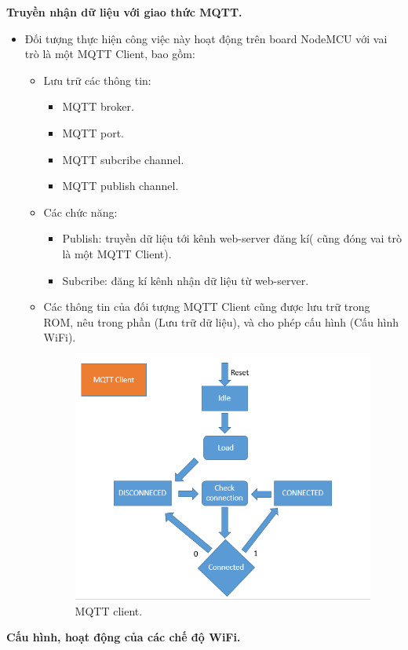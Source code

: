 \documentclass[a4paper,12pt,oneside]{article}
\begin{document}
\noindent \textbf{Truyền nhận dữ liệu với giao thức MQTT.}
	\begin{itemize}
	\item Đối tượng thực hiện công việc này hoạt động trên board NodeMCU với vai trò là một MQTT Client, bao gồm:
		\begin{itemize}
		\item Lưu trữ các thông tin:
			\begin{itemize}
			\item	MQTT broker.
			\item	MQTT port.
			\item	MQTT subcribe channel.
			\item	MQTT publish channel.
			\end{itemize}
		\item	Các chức năng:
			\begin{itemize}
				\item Publish: truyền dữ liệu tới kênh web-server đăng kí( cũng đóng vai trò là một MQTT Client).
				\item	Subcribe: đăng kí kênh nhận dữ liệu từ web-server.
			\end{itemize}
		\item Các thông tin của đối tượng MQTT Client cũng được lưu trữ trong ROM, nêu trong phần (Lưu trữ dữ liệu), và cho phép cấu hình (Cấu hình WiFi).
		
			\begin{center}
			\begin{figure}[h!]
			\begin{center}
			\includegraphics[scale=.6]{hinh/mqtt_client.PNG}
			\end{center}
			\caption{MQTT client.}
			\end{figure}
			\end{center}

		\end{itemize}
	\end{itemize}
\noindent	\textbf{Cấu hình, hoạt động của các chế độ WiFi.}
\end{document}
